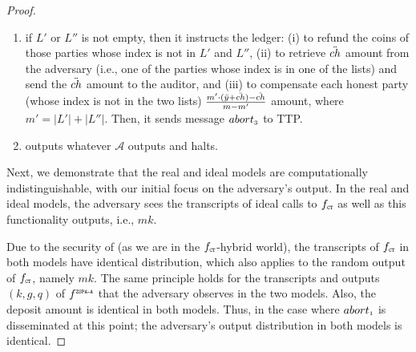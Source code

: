 \begin{proof}
\begin{enumerate}
\begin{enumerate}
%
\item if  $  L'$ or $  L''$ is not empty, then it instructs the ledger: (i) to refund the coins of those parties whose index is not in $  L'$ and $  L''$, (ii) to retrieve $\ddot{ch}$ amount from the adversary (i.e., one of the parties whose index is in one of the lists) and send the $\ddot{ch}$ amount to the auditor, and (iii) to compensate each honest party (whose index is not in the two lists)  $\frac{m'\cdot (\ddot{y}+\ddot{ch})-\ddot{ch}}{m-m'}$ amount, where $m'=|  L'|+|  L''|$.  Then, it sends  message $abort_{\scriptscriptstyle 3}$ to TTP. 
%
\item outputs whatever $\mathcal{A}$ outputs and halts. 
 \end{enumerate}
%
\end{enumerate}

Next, we demonstrate that the real and ideal models are computationally indistinguishable, with our initial focus on the adversary's output. In the real and ideal models, the adversary sees the transcripts of ideal calls to $f_{\scriptscriptstyle \mathtt{CT}}$ as well as this functionality outputs, i.e., $mk$. 

Due to the security of \ct (as we are in the $f_{\scriptscriptstyle \mathtt{CT}}$-hybrid world), the transcripts of $f_{\scriptscriptstyle \mathtt{CT}}$ in both models have identical distribution, which also applies to the random output of $f_{\scriptscriptstyle \mathtt{CT}}$, namely $mk$. The same principle holds for the transcripts and outputs $(  k,   g,   q)$ of $f^{\scriptscriptstyle \mathtt{ZSPA\text{-}A}}$ that the adversary observes in the two models. Also, the deposit amount is identical in both models. Thus, in the case where $abort_{\scriptscriptstyle 1}$ is disseminated at this point; the adversary's output distribution in both models is identical. 




\end{proof}
